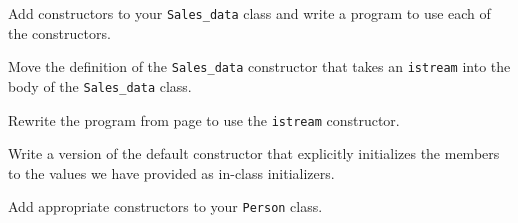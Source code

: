 %
%
\begin{question}
Add constructors to your \verb|Sales_data| class and write a
program to use each of the constructors.
\end{question}

\begin{question}
Move the definition of the \verb|Sales_data| constructor that
takes an \verb|istream| into the body of the \verb|Sales_data| class.
\end{question}

\begin{question}
Rewrite the program from page \pageref{lst: use these functions to write a version of the bookstore program that works with sales-data} to use the \verb|istream|
constructor.
\end{question}

\begin{question}
Write a version of the default constructor that explicitly
initializes the members to the values we have provided as in-class initializers.
\end{question}

\begin{question}
Add appropriate constructors to your \verb|Person| class.
\end{question}
